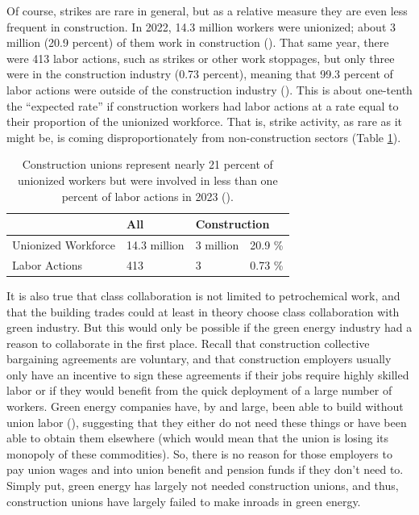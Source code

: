 \documentclass[12pt]{article}
\begin{document}
Of course, strikes are rare in general, but as a relative measure they are even less frequent in construction. In 2022, 14.3 million workers were unionized; about 3 million (20.9 percent) of them work in construction (\cite{blsUnionMembersSummary2024}). That same year, there were 413 labor actions, such as strikes or other work stoppages, but only three were in the construction industry (0.73 percent), meaning that 99.3 percent of labor actions were outside of the construction industry (\cite{ilrschoolILRLaborAction}). This is about one-tenth the “expected rate” if construction workers had labor actions at a rate equal to their proportion of the unionized workforce. That is, strike activity, as rare as it might be, is coming disproportionately from non-construction sectors (Table \ref{tab:strikes}).

\begin{table}[b]
\centering
\begin{tabular}{llll}
                    & All            & \multicolumn{2}{l}{Construction} \\ \hline
Unionized Workforce & 14.3 million	& 3 million				& 20.9 \%     \\
Labor Actions       		& 413				& 3							& 0.73 \%    
\end{tabular}
\captionsetup{justification=centering, singlelinecheck=false, margin=2cm} 
\caption[Labor Actions]{Construction unions represent nearly 21 percent of unionized workers but were involved in less than one percent of labor actions in 2023 (\cite{ilrschoolILRLaborAction}).}
\label{tab:strikes}
\end{table}

It is also true that class collaboration is not limited to petrochemical work, and that the building trades could at least in theory choose class collaboration with green industry. But this would only be possible if the green energy industry had a reason to collaborate in the first place. Recall that construction collective bargaining agreements are voluntary, and that construction employers usually only have an incentive to sign these agreements if their jobs require highly skilled labor or if they would benefit from the quick deployment of a large number of workers. Green energy companies have, by and large, been able to build without union labor (\cite{scheiberBuildingSolarFarms2021}), suggesting that they either do not need these things or have been able to obtain them elsewhere (which would mean that the union is losing its monopoly of these commodities). So, there is no reason for those employers to pay union wages and into union benefit and pension funds if they don’t need to. Simply put, green energy has largely not needed construction unions, and thus, construction unions have largely failed to make inroads in green energy.
\end{document}
